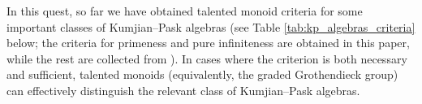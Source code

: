 \documentclass[a4paper,reqno,12pt]{amsart}
\numberwithin{equation}{section}
\theoremstyle{definition}
\theoremstyle{remark}
\newcommand{\gr}{\operatorname{gr}}
\newcommand{\KP}{\operatorname{KP}}
\begin{document}

In this quest, so far we have obtained talented monoid criteria for some important classes of Kumjian--Pask algebras (see Table \ref{tab:kp_algebras_criteria} below; the criteria for primeness and pure infiniteness are obtained in this paper, while the rest are collected from \cite{HMPS1, HLM}). In cases where the criterion is both necessary and sufficient, talented monoids (equivalently, the graded Grothendieck group) can effectively distinguish the relevant class of Kumjian--Pask algebras.
\end{document}
